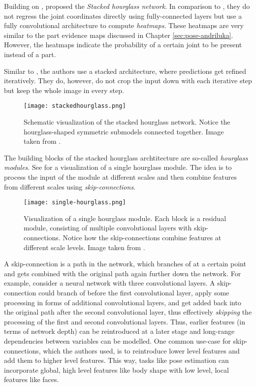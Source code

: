 Building on \cite{toshev_deeppose:_2014}, \cite{newell_stacked_2016} proposed the \textit{Stacked hourglass network}.
In comparison to \cite{toshev_deeppose:_2014}, they do not regress the joint coordinates directly using fully-connected layers but use a fully convolutional architecture to compute \textit{heatmaps}.
These heatmaps are very similar to the part evidence maps discussed in Chapter \ref{sec:pose-andriluka}.
However, the heatmaps indicate the probability of a certain joint to be present instead of a part.

Similar to \cite{toshev_deeppose:_2014}, the authors use a stacked architecture, where predictions get refined iteratively.
They do, however, do not crop the input down with each iterative step but keep the whole image in every step.

\begin{figure}[htb!]
    \centering
    \texttt{[image: stackedhourglass.png]}
    \caption{Schematic visualization of the stacked hourglass network. Notice the hourglass-shaped symmetric submodels connected together. Image taken from \cite{newell_stacked_2016}. }
    \label{fig:stacked-hg-architecture}
\end{figure}

The building blocks of the stacked hourglass archtitecture are so-called \textit{hourglass modules}.
See  for a visualization of a single hourglass module.
The idea is to process the input of the module at different scales and then combine features from different scales using \textit{skip-connections}.

\begin{figure}[htb!]
    \centering
    \texttt{[image: single-hourglass.png]}
    \caption{Visualization of a single hourglass module. Each block is a residual module, consisting of multiple convolutional layers with skip-connections. Notice how the skip-connections combine features at different scale levels. Image taken from \cite{newell_stacked_2016}. }
    \label{fig:single-hourglass}
\end{figure}

A skip-connection is a path in the network, which branches of at a certain point and gets combined with the original path again further down the network.
For example, consider a neural network with three convolutional layers.
A skip-connection could branch of before the first convolutional layer, apply some processing in forms of additional convolutional layers, and get added back into the original path after the second convolutional layer, thus effectively \textit{skipping} the processing of the first and second convolutional layers.
Thus, earlier features (in terms of network depth) can be reintroduced at a later stage and long-range dependencies between variables can be modelled.
One common use-case for skip-connections, which the authors used, is to reintroduce lower level features and add them to higher level features.
This way, tasks like pose estimation can incorporate global, high level features like body shape with low level, local features like faces.

